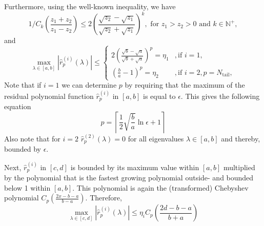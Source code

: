 Furthermore, using the well-known inequality, we have
\begin{equation}
    1/C_{k}\left(\frac{z_1 + z_2}{z_1 - z_2}\right) \leq 2 \left(\frac{\sqrt{z_2} - \sqrt{z_1}}{\sqrt{z_2} + \sqrt{z_1}}\right)^k, \text{ for } z_1 > z_2 > 0 \text{ and } k \in \mathbb{N}^+,
    \label{eq:chebyshev_polynomial_bound}
\end{equation}
and
\begin{equation*}
    \max_{\lambda \in [a,b]} |\hat{r}^{(i)}_p(\lambda)| \leq
    \begin{cases}
        2\left(\frac{\sqrt{b}-\sqrt{a}}{\sqrt{b}+\sqrt{a}}\right)^p=\eta_1 &, \text{if } i = 1,\\
        \left(\frac{b}{a}-1\right)^p=\eta_2 &, \text{if } i = 2, p = N_{\text{tail}},
    \end{cases}
\end{equation*}
Note that if $i=1$ we can determine $p$ by requiring that the maximum of the residual polynomial function $\hat{r}^{(i)}_p$ in $[a,b]$ is equal to $\epsilon$. This gives the following equation
\begin{equation}
    p = \left\lceil\frac{1}{2}\sqrt{\frac{b}{a}}\ln{\epsilon} + 1\right\rceil
    \label{eq:chebyshev_degree_p}
\end{equation}
Also note that for $i=2$ $\hat{r}^{(2)}_p(\lambda) = 0$ for all eigenvalues $\lambda \in [a,b]$ and thereby, bounded by $\epsilon$.

Next, $\hat{r}^{(i)}_p$ in $[c,d]$ is bounded by its maximum value within $[a,b]$ multiplied by the polynomial that is the fastest growing polynomial outside- and bounded below 1 within $[a,b]$. This polynomial is again the (transformed) Chebyshev polynomial $C_{p}\left(\frac{2x - b - a}{b - a}\right)$. Therefore,
\begin{equation*}
    \max_{\lambda \in [c,d]} |\hat{r}^{(i)}_p(\lambda)| \leq \eta_i C_{p}\left(\frac{2d - b - a}{b + a}\right)
\end{equation*}


